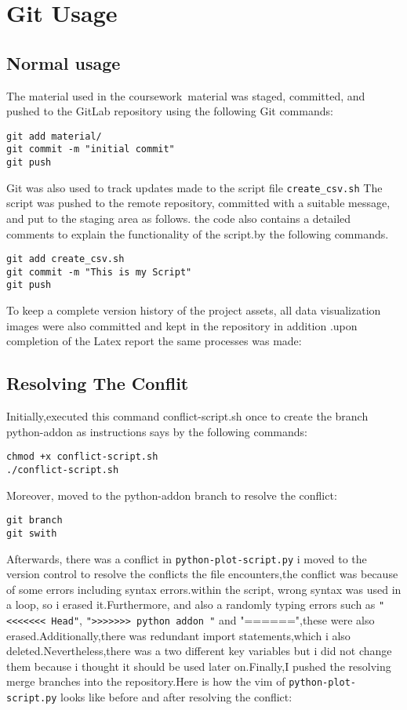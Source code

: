 \documentclass[12pt]{article}
\begin{document}
\newpage\section{Git Usage} 
\subsection{Normal usage}
The material used in the coursework material was staged, committed, and pushed to the GitLab repository using the following Git commands:
\begin{verbatim}
git add material/
git commit -m "initial commit"
git push 
\end{verbatim}

Git was also used to track updates made to the script file \texttt{create\_csv.sh} The script was pushed to the remote repository, committed with a suitable message, and put to the staging area as follows. the code also contains a detailed comments to explain the functionality of the script.by the following commands.

\begin{verbatim}
git add create_csv.sh
git commit -m "This is my Script"
git push 
\end{verbatim}

To keep a complete version history of the project assets, all data visualization images were also committed and kept in the repository in addition .upon completion of the Latex report the same processes was made:


\subsection{Resolving The Conflit}
Initially,executed this command conflict-script.sh once to create the branch python-addon as instructions says by the following commands:
\begin{verbatim}
chmod +x conflict-script.sh
./conflict-script.sh 
\end{verbatim}
Moreover, moved to the python-addon branch to resolve the conflict:
\begin{verbatim}
git branch 
git swith 
\end{verbatim}

Afterwards, there was a conflict in  \texttt{python-plot-script.py}
 i moved to the version control to resolve the conflicts the file encounters,the conflict was because of some errors including syntax errors.within the script,
wrong syntax was used in a loop, so i erased it.Furthermore, and also a randomly typing errors such as \texttt{"<<<<<<< Head"}, \texttt{">>>>>>> python addon "}  and "======",these were also erased.Additionally,there was redundant import statements,which i also deleted.Nevertheless,there was a two different key variables but i did not change them because i thought it should be used later on.Finally,I pushed the resolving merge branches into the repository.Here is how the vim of   \texttt{python-plot-script.py} looks like before and after resolving the conflict:
\end{document}
